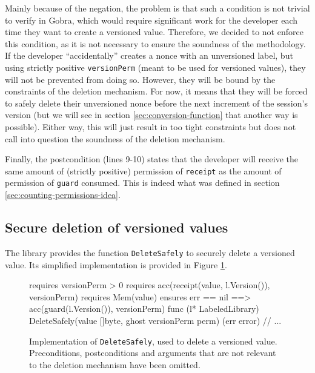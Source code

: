 Mainly because of the negation, the problem is that such a condition is not trivial to verify in Gobra, which would require significant work for the developer each time they want to create a versioned value.
Therefore, we decided to not enforce this condition, as it is not necessary to ensure the soundness of the methodology.
If the developer “accidentally” creates a nonce with an unversioned label, but using strictly positive \texttt{versionPerm} (meant to be used for versioned values), they will not be prevented from doing so.
However, they will be bound by the constraints of the deletion mechanism. For now, it means that they will be forced to safely delete their unversioned nonce before the next increment of the session's version (but we will see in section \ref{sec:conversion-function} that another way is possible).
Either way, this will just result in too tight constraints but does not call into question the soundness of the deletion mechanism.

Finally, the postcondition (lines 9-10) states that the developer will receive the same amount of (strictly positive) permission of \texttt{receipt} as the amount of permission of \texttt{guard} consumed. This is indeed what was defined in section \ref{sec:counting-permissions-idea}.

\subsection{Secure deletion of versioned values}
\label{sec:secure-deletion-of-versioned-values}

The library provides the function \texttt{DeleteSafely} to securely delete a versioned value. Its simplified implementation is provided in Figure \ref{lst:delete-safely}.

\begin{figure}
    \begin{gobra}
requires versionPerm > 0
requires acc(receipt(value, l.Version()), versionPerm)
requires Mem(value)
ensures  err == nil ==> acc(guard(l.Version()), versionPerm)
func (l* LabeledLibrary) DeleteSafely(value []byte,
    ghost versionPerm perm) (err error) {
    // ...
}
    \end{gobra}
    \caption{Implementation of \texttt{DeleteSafely}, used to delete a versioned value. Preconditions, postconditions and arguments that are not relevant to the deletion mechanism have been omitted.}
    \label{lst:delete-safely}
\end{figure}

